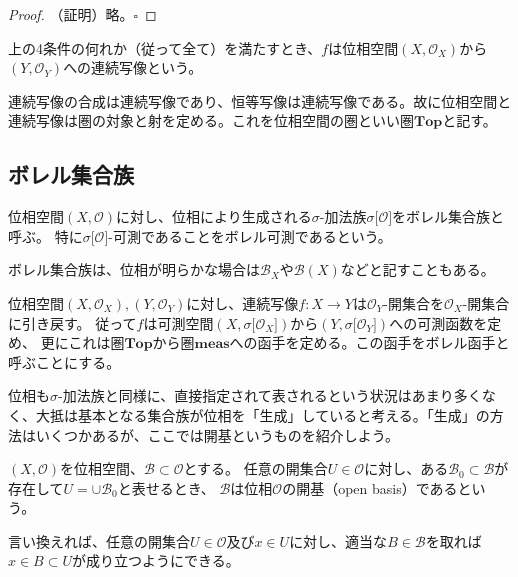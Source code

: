 \documentclass[../root.tex]{subfiles}
\begin{document}
\begin{proof}
（証明）略。$ \square $
\end{proof}

\begin{Def}{}{}
上の4条件の何れか（従って全て）を満たすとき、$ f $は位相空間$ ( X, \mathcal{O}_{X} ) $から$ ( Y, \mathcal{O}_{Y} ) $への連続写像という。
\end{Def}

連続写像の合成は連続写像であり、恒等写像は連続写像である。故に位相空間と連続写像は圏の対象と射を定める。これを位相空間の圏といい圏$ \mathbf{Top} $と記す。




\subsection{ボレル集合族}
\begin{Def}{}{}
位相空間$ ( X, \mathcal{O} ) $に対し、位相により生成される$ \sigma $-加法族$ \sigma\lbrack \mathcal{O} \rbrack $をボレル集合族と呼ぶ。
特に$ \sigma\lbrack \mathcal{O} \rbrack $-可測であることをボレル可測であるという。
\end{Def}

ボレル集合族は、位相が明らかな場合は$ \mathscr{B}_{X} $や$ \mathscr{B}( X ) $などと記すこともある。

位相空間$ ( X, \mathcal{O}_{X} ), ( Y, \mathcal{O}_{Y} ) $に対し、連続写像$ f\colon X\rightarrow Y $は$ \mathcal{O}_{Y} $-開集合を$ \mathcal{O}_{X} $-開集合に引き戻す。
従って$ f $は可測空間$ ( X, \sigma\lbrack \mathcal{O}_{X} \rbrack ) $から$ ( Y, \sigma\lbrack \mathcal{O}_{Y} \rbrack ) $への可測函数を定め、
更にこれは圏$ \mathbf{Top} $から圏$ \mathbf{meas} $への函手を定める。この函手をボレル函手と呼ぶことにする。

位相も$ \sigma $-加法族と同様に、直接指定されて表されるという状況はあまり多くなく、大抵は基本となる集合族が位相を「生成」していると考える。「生成」の方法はいくつかあるが、ここでは開基というものを紹介しよう。

\begin{Def}{}{}
$ ( X, \mathcal{O} ) $を位相空間、$ \mathcal{B}\subset\mathcal{O} $とする。
任意の開集合$ U\in\mathcal{O} $に対し、ある$ \mathcal{B}_{0}\subset\mathcal{B} $が存在して$ U=\cup\mathcal{B}_{0} $と表せるとき、
$ \mathcal{B} $は位相$ \mathcal{O} $の開基（open basis）であるという。
\end{Def}

言い換えれば、任意の開集合$ U\in\mathcal{O} $及び$ x\in U $に対し、適当な$ B\in\mathcal{B} $を取れば$ x\in B\subset U $が成り立つようにできる。
\end{document}
